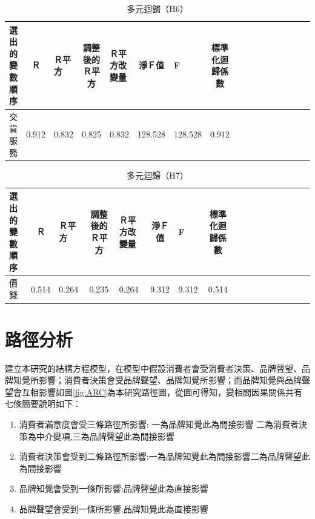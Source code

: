 \begin{table}[H]
\caption{多元迴歸（H6）}
\label{tab:QH6}
\centering
\renewcommand{\arraystretch}{1} %
\arrayrulewidth=1pt               %
\tabcolsep=4pt                   %
\begin{tabular}[t]{lclclclclclclclcl}  %
\hline
選出的變數順序&Ｒ&Ｒ平方&調整後的Ｒ平方&Ｒ平方改變量&淨Ｆ值&F&標準化迴歸係數\\
\hline
交貨服務	&0.912 & 0.832 & 0.825	& 0.832 & 128.528	& 128.528 & 0.912\\
\hline
\end{tabular}
\end{table}

\begin{table}[H]
\caption{多元迴歸（H7）}
\label{tab:QH7}
\centering
\renewcommand{\arraystretch}{1} %
\arrayrulewidth=1pt               %
\tabcolsep=4pt                   %
\begin{tabular}[t]{lclclclclclclclcl}  %
\hline
選出的變數順序&Ｒ&Ｒ平方&調整後的Ｒ平方&Ｒ平方改變量&淨Ｆ值&F&標準化迴歸係數\\
\hline
價錢	&0.514 & 0.264 & 0.235	& 0.264	& 9.312	& 9.312	& 0.514\\
\hline
\end{tabular}
\end{table}


\section{路徑分析}
建立本研究的結構方程模型，在模型中假設消費者會受消費者決策、品牌聲望、品牌知覺所影響；消費者決策會受品牌聲望、品牌知覺所影響；而品牌知覺與品牌聲望會互相影響如圖\ref{fig:ARC}為本研究路徑圖，從圖可得知，變相間因果關係共有七條簡要說明如下：
\begin{enumerate}
\item 消費者滿意度會受三條路徑所影響: 一為品牌知覺此為間接影響 二為消費者決策為中介變項,三為品牌聲望此為間接影響
\item 消費者決策會受到二條路徑所影響:一為品牌知覺此為間接影響二為品牌聲望此為間接影響
\item 品牌知覺會受到一條所影響:品牌聲望此為直接影響
\item 品牌聲望會受到一條所影響:品牌知覺此為直接影響
\end{enumerate}

